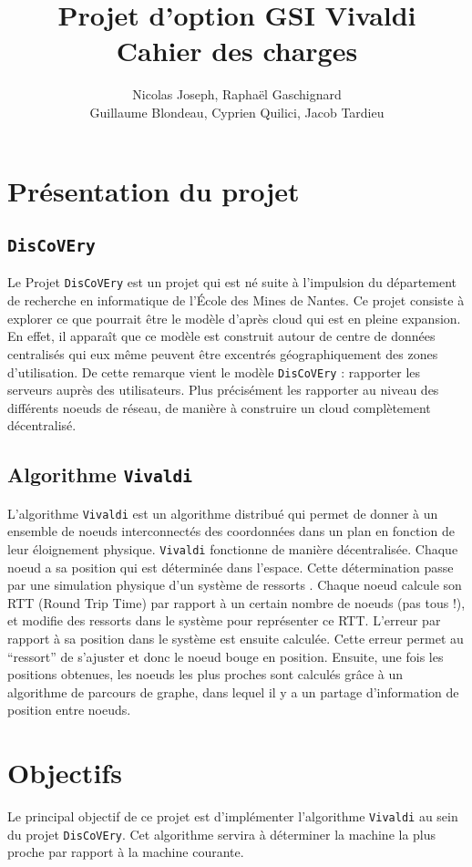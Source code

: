 \documentclass[11pt,a4paper]{article}
\title{Projet d'option GSI Vivaldi \\ Cahier des charges}
\author{Nicolas Joseph, Raphaël Gaschignard\\ Guillaume Blondeau, Cyprien Quilici, Jacob Tardieu}
\begin{document}
\maketitle
\section{Présentation du projet}
\subsection{\texttt{DisCoVEry}}

Le Projet \texttt{DisCoVEry} est un projet qui est né suite à l’impulsion du département de recherche en informatique de l'École des Mines de Nantes. Ce projet consiste à explorer ce que pourrait être le modèle d’après cloud qui est en pleine expansion. En effet, il apparaît que ce modèle est construit autour de centre de données centralisés qui eux même peuvent être excentrés géographiquement des zones d’utilisation. De cette remarque vient  le modèle \texttt{DisCoVEry} : rapporter les serveurs auprès des utilisateurs. Plus précisément les rapporter au niveau des différents noeuds de réseau, de manière à construire un cloud complètement décentralisé.

\subsection{Algorithme \texttt{Vivaldi}}
L'algorithme \texttt{Vivaldi} \cite{vivaldi} est un algorithme distribué qui permet  de donner à un ensemble de noeuds interconnectés des coordonnées dans un plan en fonction de leur éloignement physique.
\texttt{Vivaldi} fonctionne de manière décentralisée. Chaque noeud a sa position qui est déterminée dans l’espace. Cette détermination passe par une simulation physique d’un système de ressorts . Chaque noeud calcule son RTT (Round Trip Time) par rapport à un certain nombre de noeuds (pas tous !), et modifie des ressorts dans le système pour représenter ce RTT. L’erreur par rapport à sa position dans le système est ensuite calculée. Cette erreur permet au “ressort” de s’ajuster et donc le noeud bouge en position.
Ensuite, une fois les positions obtenues, les noeuds les plus proches sont calculés grâce à un algorithme de parcours de graphe, dans lequel il y a un partage d'information de position entre noeuds.

\section{Objectifs}
Le principal objectif de ce projet est d'implémenter l'algorithme \texttt{Vivaldi} au sein du projet \texttt{DisCoVEry}. Cet algorithme servira à déterminer la machine la plus proche par rapport à la machine courante.\\
\end{document}
